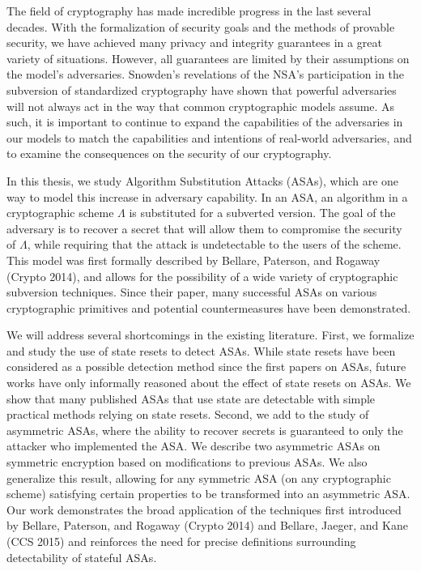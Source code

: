 The field of cryptography has made incredible progress in the last several decades. With the formalization of security goals and the methods of provable security, we have achieved many privacy and integrity guarantees in a great variety of situations. However, all guarantees are limited by their assumptions on the model's adversaries. Snowden's revelations of the NSA's participation in the subversion of standardized cryptography have shown that powerful adversaries will not always act in the way that common cryptographic models assume. As such, it is important to continue to expand the capabilities of the adversaries in our models to match the capabilities and intentions of real-world adversaries, and to examine the consequences on the security of our cryptography.

In this thesis, we study Algorithm Substitution Attacks (ASAs), which are one way to model this increase in adversary capability. In an ASA, an algorithm in a cryptographic scheme $\Lambda$ is substituted for a subverted version. The goal of the adversary is to recover a secret that will allow them to compromise the security of $\Lambda$, while requiring that the attack is undetectable to the users of the scheme. This model was first formally described by Bellare, Paterson, and Rogaway (Crypto 2014), and allows for the possibility of a wide variety of cryptographic subversion techniques. Since their paper, many successful ASAs on various cryptographic primitives and potential countermeasures have been demonstrated.

We will address several shortcomings in the existing literature. First, we formalize and study the use of state resets to detect ASAs. While state resets have been considered as a possible detection method since the first papers on ASAs, future works have only informally reasoned about the effect of state resets on ASAs. We show that many published ASAs that use state are detectable with simple practical methods relying on state resets. Second, we add to the study of asymmetric ASAs, where the ability to recover secrets is guaranteed to only the attacker who implemented the ASA. We describe two asymmetric ASAs on symmetric encryption based on modifications to previous ASAs. We also generalize this result, allowing for any symmetric ASA (on any cryptographic scheme) satisfying certain properties to be transformed into an asymmetric ASA. Our work demonstrates the broad application of the techniques first introduced by Bellare, Paterson, and Rogaway (Crypto 2014) and Bellare, Jaeger, and Kane (CCS 2015) and reinforces the need for precise definitions surrounding detectability of stateful ASAs.
